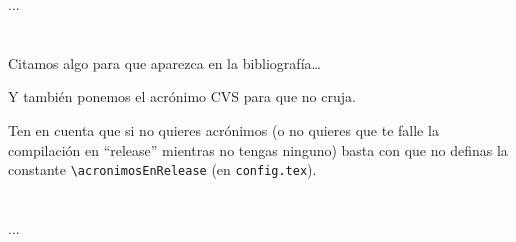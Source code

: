 ...

\section*{\NotasBibliograficas}
\TocNotasBibliograficas

Citamos algo para que aparezca en la bibliografía\ldots
\citep{ldesc2e}

\medskip

Y también ponemos el acrónimo \ac{CVS} para que no cruja.

Ten en cuenta que si no quieres acrónimos (o no quieres que te falle la compilación en ``release'' mientras no tengas ninguno) basta con que no definas la constante \verb+\acronimosEnRelease+ (en \texttt{config.tex}).


\section*{\ProximoCapitulo}
\TocProximoCapitulo

...

